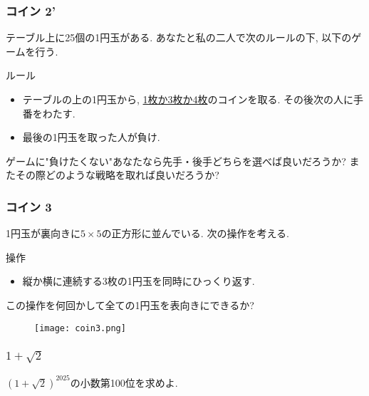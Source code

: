 \documentclass[11pt,dvipdfmx]{beamer}
\theoremstyle{definition}
\theoremstyle{remark}
\begin{document}
\begin{frame}
\frametitle{コイン 2'}
テーブル上に25個の1円玉がある.
あなたと私の二人で次のルールの下, 以下のゲームを行う.

 \begin{block}{ルール}
\begin{itemize}
\item テーブルの上の1円玉から, \underline{1枚か3枚か4枚}のコインを取る. その後次の人に手番をわたす.
\item 最後の1円玉を取った人が負け.
\end{itemize}
   \end{block}

ゲームに"負けたくない"あなたなら先手・後手どちらを選べば良いだろうか?
またその際どのような戦略を取れば良いだろうか?


\end{frame}


\begin{frame}
\frametitle{コイン 3}
1円玉が裏向きに$5 \times 5$の正方形に並んでいる. 次の操作を考える. 
 \begin{block}{操作}
\begin{itemize}
\item 縦か横に連続する3枚の1円玉を同時にひっくり返す.
\end{itemize}
   \end{block}
 この操作を何回かして全ての1円玉を表向きにできるか?
 
 \begin{figure}[htbp]
\begin{center}
\texttt{[image: coin3.png]}
\end{center}
\end{figure}

\end{frame}

\begin{frame}
\frametitle{$1 + \sqrt{2}$}
$(1 + \sqrt{2})^{2025}$の小数第100位を求めよ.
\end{frame}
\end{document}
